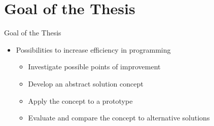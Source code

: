 \documentclass{beamer}
\begin{document}
\begin{frame}[plain]
  \titlepage{}
\end{frame}

\begin{frame}[allowframebreaks]{}
  \tableofcontents
\end{frame}

\section{Goal of the Thesis}
\begin{frame}{Goal of the Thesis}
  \begin{itemize}
    \large
    \setlength\itemsep{1em}
    \setlength{\parskip}{12pt}
    \item Possibilities to increase efficiency in programming
          \begin{itemize}
            \large
            \setlength\itemsep{1em}
            \item Investigate possible points of improvement
            \item Develop an abstract solution concept
            \item Apply the concept to a prototype
            \item Evaluate and compare the concept to alternative solutions
          \end{itemize}
  \end{itemize}
  \vfill
\end{frame}


\end{document}
